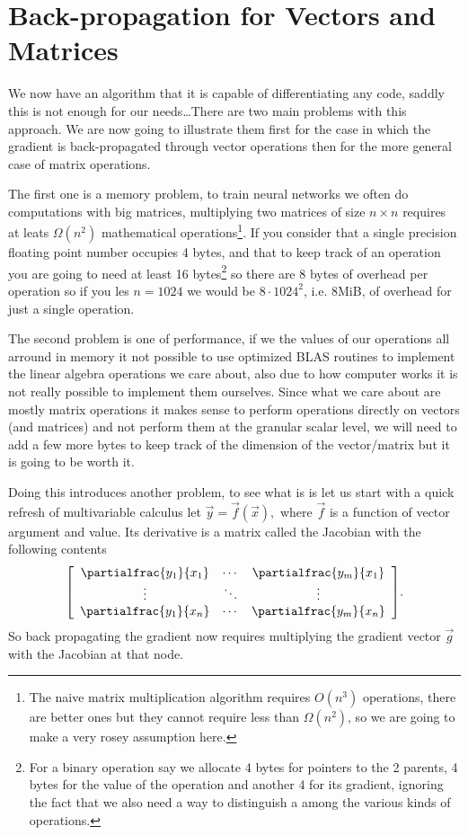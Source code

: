 \documentclass{article}
\begin{document}
\section{Back-propagation for Vectors and Matrices}

We now have an algorithm that it is capable of differentiating any code, saddly
this is not enough for our needs\dots There are two main problems with this
approach. We are now going to illustrate them first for the case in which the
gradient is back-propagated through vector operations then for the more general
case of matrix operations.

The first one is a memory problem, to train neural networks we often
do computations with big matrices, multiplying two matrices of size \(n \times
n\) requires at leats \(\Omega(n^2)\) mathematical operations\footnote{The
naive matrix multiplication algorithm requires \(O(n^3)\) operations, there are
better ones but they cannot require less than \(\Omega(n^2)\), so we are going
to make a very rosey assumption here.}. If you consider that a single precision
floating point number occupies 4 bytes, and that to keep track of an operation
you are going to need at least 16 bytes\footnote{For a binary operation say we
allocate 4 bytes for pointers to the 2 parents, 4 bytes for the value of the
operation and another 4 for its gradient, ignoring the fact that we also need a
way to distinguish a among the various kinds of operations.} so there are 8
bytes of overhead per
operation so if you les \(n=1024\) we would be \(8 \cdot 1024^2\), i.e. 8MiB,
of overhead for just a single operation.

The second problem is one of performance, if we the values of our operations
all arround in memory it not possible to use optimized BLAS routines to
implement the linear algebra operations we care about, also due to how computer
works it is not really possible to implement them ourselves. Since what we care
about are mostly matrix operations it makes sense to perform operations
directly on vectors (and matrices) and not perform them at the granular scalar
level, we will need to add a few more bytes to keep track of the dimension of
the vector/matrix but it is going to be worth it.

Doing this introduces another problem, to see what is is let us start with a
quick refresh of multivariable calculus let \(\vec y = \vec f(\vec x),\) where
\(\vec f\) is a function of vector argument and value. Its derivative is a
matrix called the Jacobian with the following contents \[
\left[\begin{array}{ccc}
\partialfrac{y_1}{x_1} & \cdots & \partialfrac{y_m}{x_1} \\
\vdots & \ddots & \vdots \\
\partialfrac{y_1}{x_n} & \cdots & \partialfrac{y_m}{x_n} \\
\end{array}\right]\!.
\] So back propagating the gradient now requires multiplying the gradient
vector \(\vec g\) with the Jacobian at that node.
\end{document}
